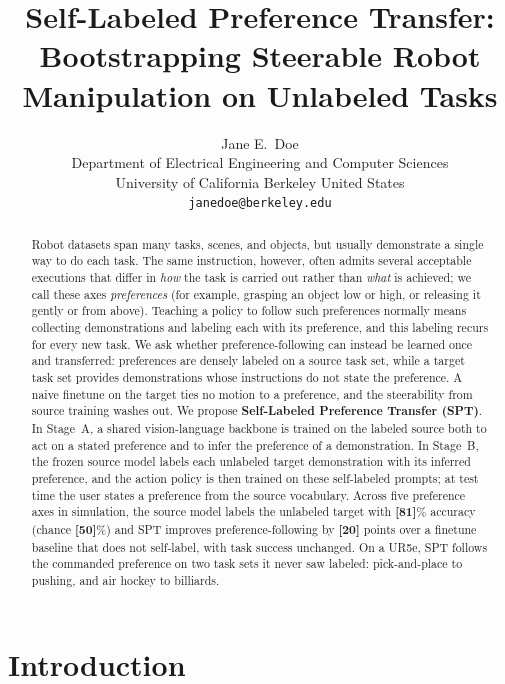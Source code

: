 \documentclass{article}
\title{Self-Labeled Preference Transfer: Bootstrapping Steerable Robot Manipulation on Unlabeled Tasks}
\author{
  Jane E.~Doe\\
  Department of Electrical Engineering and Computer Sciences\\
  University of California Berkeley
  United States\\
  \texttt{janedoe@berkeley.edu}
}
\begin{document}
\maketitle


\begin{abstract}
Robot datasets span many tasks, scenes, and objects, but usually demonstrate a single way to do each task.
The same instruction, however, often admits several acceptable executions that differ in \emph{how} the task is carried out rather than \emph{what} is achieved; we call these axes \emph{preferences} (for example, grasping an object low or high, or releasing it gently or from above).
Teaching a policy to follow such preferences normally means collecting demonstrations and labeling each with its preference, and this labeling recurs for every new task.
We ask whether preference-following can instead be learned once and transferred: preferences are densely labeled on a source task set, while a target task set provides demonstrations whose instructions do not state the preference.
A naive finetune on the target ties no motion to a preference, and the steerability from source training washes out.
We propose \textbf{Self-Labeled Preference Transfer (SPT)}.
In Stage~A, a shared vision-language backbone is trained on the labeled source both to act on a stated preference and to infer the preference of a demonstration.
In Stage~B, the frozen source model labels each unlabeled target demonstration with its inferred preference, and the action policy is then trained on these self-labeled prompts; at test time the user states a preference from the source vocabulary.
Across five preference axes in simulation, the source model labels the unlabeled target with \textbf{[81]}\% accuracy (chance \textbf{[50]}\%) and SPT improves preference-following by \textbf{[20]} points over a finetune baseline that does not self-label, with task success unchanged.
On a UR5e, SPT follows the commanded preference on two task sets it never saw labeled: pick-and-place to pushing, and air hockey to billiards.

\end{abstract}



\section{Introduction}
\end{document}

